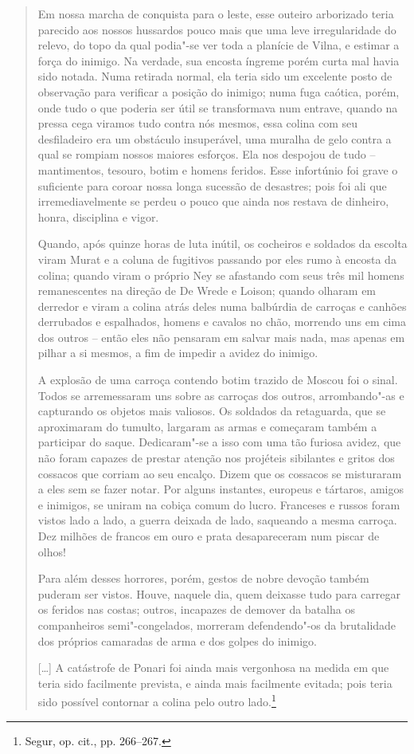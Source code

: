 \begin{quote}
Em nossa marcha de conquista para o leste, esse outeiro arborizado teria
parecido aos nossos hussardos pouco mais que uma leve irregularidade do
relevo, do topo da qual podia"-se ver toda a planície de Vilna, e estimar
a força do inimigo. Na verdade, sua encosta íngreme porém curta mal
havia sido notada. Numa retirada normal, ela teria sido um excelente
posto de observação para verificar a posição do inimigo; numa fuga
caótica, porém, onde tudo o que poderia ser útil se transformava num
entrave, quando na pressa cega viramos tudo contra nós mesmos, essa
colina com seu desfiladeiro era um obstáculo insuperável, uma muralha de
gelo contra a qual se rompiam nossos maiores esforços. Ela nos despojou
de tudo -- mantimentos, tesouro, botim e homens feridos. Esse infortúnio
foi grave o suficiente para coroar nossa longa sucessão de desastres;
pois foi ali que irremediavelmente se perdeu o pouco que ainda nos
restava de dinheiro, honra, disciplina e vigor.

Quando, após quinze horas de luta inútil, os cocheiros e soldados da
escolta viram Murat e a coluna de fugitivos passando por eles rumo à
encosta da colina; quando viram o próprio Ney se afastando com seus três
mil homens remanescentes na direção de De Wrede e Loison; quando olharam
em derredor e viram a colina atrás deles numa balbúrdia de carroças e
canhões derrubados e espalhados, homens e cavalos no chão, morrendo uns
em cima dos outros -- então eles não pensaram em salvar mais nada, mas
apenas em pilhar a si mesmos, a fim de impedir a avidez do inimigo.

A explosão de uma carroça contendo botim trazido de Moscou foi o sinal.
Todos se arremessaram uns sobre as carroças dos outros, arrombando"-as e
capturando os objetos mais valiosos. Os soldados da retaguarda, que se
aproximaram do tumulto, largaram as armas e começaram também a
participar do saque. Dedicaram"-se a isso com uma tão furiosa avidez, que
não foram capazes de prestar atenção nos projéteis sibilantes e gritos
dos cossacos que corriam ao seu encalço. Dizem que os cossacos se
misturaram a eles sem se fazer notar. Por alguns instantes, europeus e
tártaros, amigos e inimigos, se uniram na cobiça comum do lucro.
Franceses e russos foram vistos lado a lado, a guerra deixada de lado,
saqueando a mesma carroça. Dez milhões de francos em ouro e prata
desapareceram num piscar de olhos!

Para além desses horrores, porém, gestos de nobre devoção também puderam
ser vistos. Houve, naquele dia, quem deixasse tudo para carregar os
feridos nas costas; outros, incapazes de demover da batalha os
companheiros semi"-congelados, morreram defendendo"-os da brutalidade dos
próprios camaradas de arma e dos golpes do inimigo.

[\ldots{}] A catástrofe de Ponari foi ainda mais vergonhosa na medida em
que teria sido facilmente prevista, e ainda mais facilmente evitada;
pois teria sido possível contornar a colina pelo outro lado.\footnote{Segur, op. cit., pp. 266--267.} 
\end{quote}


